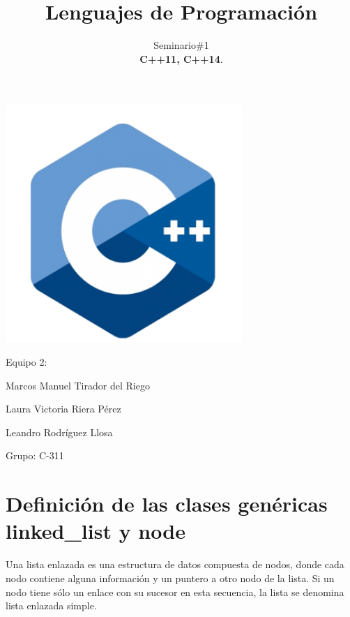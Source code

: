 \documentclass[10pt]{article}
\title{\textbf{Lenguajes de Programaci\'on}}
\author{Seminario\#1\\
	 \textbf{C++11, C++14}.}
\date{}
\begin{document}
	\begin{titlepage}
		\clearpage	
		\maketitle
		\begin{center}
			\includegraphics[width=9cm]{c++logo.png}
			
			\vspace{5em}
			Equipo 2:
			
			Marcos Manuel Tirador del Riego
			
			Laura Victoria Riera P\'erez
			
			Leandro Rodr\'iguez Llosa
			\vspace{1em}
			
			Grupo: C-311
		\end{center}
		\thispagestyle{empty}
	\end{titlepage}


\newpage
{}
\tableofcontents
\thispagestyle{empty}

\newpage
{}
\section{Definici\'on de las clases genéricas linked\_list y node}



Una lista enlazada es una estructura de datos compuesta de nodos, donde cada nodo contiene alguna información y un puntero a otro nodo de la lista. Si un nodo tiene sólo un enlace con su sucesor en esta secuencia, la lista se denomina lista enlazada simple.
\end{document}

